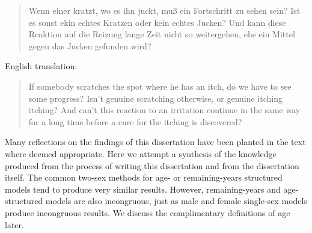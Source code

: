 \FloatBarrier
\label{sec:reflections}

\begin{singlespace}
\begin{quote}
Wenn einer kratzt, wo es ihn juckt, mu{\ss} ein Fortschritt zu sehen sein? Ist
es sonst ekin echtes Kratzen oder kein echtes Jucken? Und kann diese Reaktion
auf die Reizung lange Zeit nicht so weitergehen, ehe ein Mittel gegen das Jucken
gefunden wird?
\citep{wittgenstein1984culture}
\end{quote}

English translation:
\begin{quote}
 If somebody scratches the spot where he has an itch, do we have to see 
 some progress? Isn't genuine scratching otherwise, or genuine itching 
itching? And can't this reaction to an irritation continue in the 
same way for a long time before a cure for the itching is discovered?
\citep{wittgenstein1984culture}
\end{quote}
\end{singlespace}

Many reflections on the findings of this dissertation have been planted in the
text where deemed appropriate. Here we attempt a synthesis of the
knowledge produced from the process of writing this dissertation and from the
dissertation itself. The common two-sex methods for age- or remaining-years
structured models tend to produce very similar results. However, remaining-years
and age-structured models are also incongruous, just as male and female
single-sex models produce incongruous results. We discuss the complimentary definitions 
of age later. 



